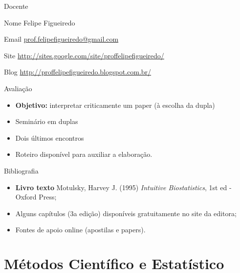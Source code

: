 \documentclass{beamer}
\begin{document}
\begin{frame}{Docente}
  \begin{block}{Nome}
    Felipe Figueiredo
  \end{block}
  \begin{block}{Email}
    \url{prof.felipefigueiredo@gmail.com}    
  \end{block}
  \begin{block}{Site}
    \url{http://sites.google.com/site/proffelipefigueiredo/}
  \end{block}
  \begin{block}{Blog}
    \url{http://proffelipefigueiredo.blogspot.com.br/}
  \end{block}
\end{frame}

\begin{frame}{Avaliação}
  \begin{itemize}
  \item {\bf Objetivo:} interpretar criticamente um paper (à escolha da dupla)
  \item Seminário em duplas
  \item Dois últimos encontros
  \item Roteiro disponível para auxiliar a elaboração.
  \end{itemize}
\end{frame}

\begin{frame}{Bibliografia}
  \begin{itemize}
  \item {\bf Livro texto} Motulsky, Harvey J. (1995) {\em Intuitive Biostatistics}, 1st ed - Oxford Press;
  \item Alguns capítulos (3a edição) disponíveis gratuitamente no site da editora;
  \item Fontes de apoio online (apostilas e papers).
  \end{itemize}
\end{frame}

\section{Métodos Científico e Estatístico}
\end{document}
